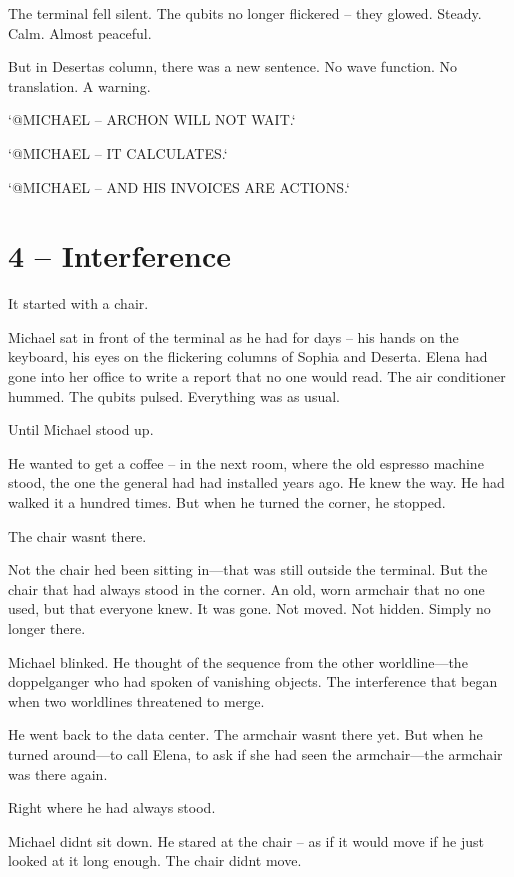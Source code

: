 \documentclass[
]{article}
\begin{document}
The terminal fell silent. The qubits no longer flickered -- they glowed. Steady. Calm. Almost peaceful.

But in Deserta\textquotesingle s column, there was a new sentence. No wave function. No translation. A warning.

`@MICHAEL -- ARCHON WILL NOT WAIT.`

`@MICHAEL -- IT CALCULATES.`

`@MICHAEL -- AND HIS INVOICES ARE ACTIONS.`

\section{4 -- Interference}\label{interference}

It started with a chair.

Michael sat in front of the terminal as he had for days -- his hands on the keyboard, his eyes on the flickering columns of Sophia and Deserta. Elena had gone into her office to write a report that no one would read. The air conditioner hummed. The qubits pulsed. Everything was as usual.

Until Michael stood up.

He wanted to get a coffee -- in the next room, where the old espresso machine stood, the one the general had had installed years ago. He knew the way. He had walked it a hundred times. But when he turned the corner, he stopped.

The chair wasn\textquotesingle t there.

Not the chair he\textquotesingle d been sitting in---that was still outside the terminal. But the chair that had always stood in the corner. An old, worn armchair that no one used, but that everyone knew. It was gone. Not moved. Not hidden. Simply no longer there.

Michael blinked. He thought of the sequence from the other worldline---the doppelganger who had spoken of vanishing objects. The interference that began when two worldlines threatened to merge.

He went back to the data center. The armchair wasn\textquotesingle t there yet. But when he turned around---to call Elena, to ask if she had seen the armchair---the armchair was there again.

Right where he had always stood.

Michael didn\textquotesingle t sit down. He stared at the chair -- as if it would move if he just looked at it long enough. The chair didn\textquotesingle t move.
\end{document}
